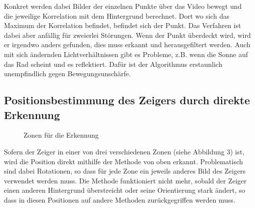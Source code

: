 \documentclass[a4paper,german,12pt,smallheadings]{scrartcl}
\begin{document}
Konkret werden dabei Bilder der einzelnen Punkte über das Video bewegt und die
jeweilige Korrelation mit dem Hintergrund berechnet. Dort wo sich das Maximum
der Korrelation befindet, befindet sich der Punkt. Das Verfahren ist dabei aber
anfällig für zweierlei Störungen. Wenn der Punkt überdeckt wird, wird er
irgendwo anders gefunden, dies muss erkannt und herausgefiltert werden. Auch
mit sich ändernden Lichtverhältnissen gibt es Probleme, z.B. wenn die Sonne auf
das Rad scheint und es reflektiert. Dafür ist der Algorithmus erstaunlich
unempfindlich gegen Bewegungsunschärfe.

\subsection{Positionsbestimmung des Zeigers durch direkte Erkennung}
\begin{figure}
  \label{zones}
  \caption{Zonen für die Erkennung}
\end{figure}
Sofern der Zeiger in einer von drei verschiedenen Zonen (siehe Abbildung 3) ist,
wird die Position direkt mithilfe der Methode von oben erkannt. Problematisch
sind dabei Rotationen, so dass für jede Zone ein jeweils anderes Bild des
Zeigers verwendet werden muss. Die Methode funktioniert nicht mehr, sobald der
Zeiger einen anderen Hintergrund überstreicht oder seine Orientierung stark
ändert, so dass in diesen Positionen auf andere Methoden zurückgegriffen werden
muss.
\end{document}
